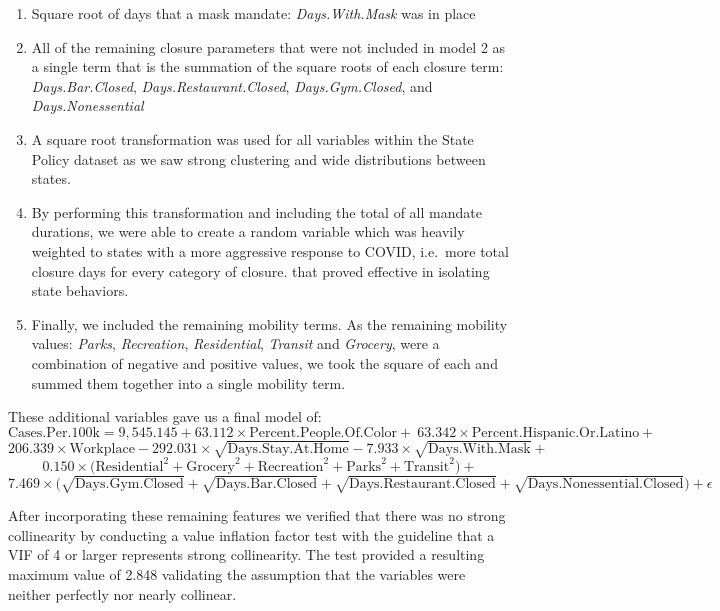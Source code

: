 \documentclass[
]{article}
\providecommand{\tightlist}{%
  \setlength{\itemsep}{0pt}\setlength{\parskip}{0pt}}
\begin{document}
\begin{enumerate}
\def\labelenumi{\arabic{enumi}.}
\tightlist
\item
  Square root of days that a mask mandate: \emph{Days.With.Mask} was in
  place
\item
  All of the remaining closure parameters that were not included in
  model 2 as a single term that is the summation of the square roots of
  each closure term: \emph{Days.Bar.Closed},
  \emph{Days.Restaurant.Closed}, \emph{Days.Gym.Closed}, and
  \emph{Days.Nonessential}
\item
  A square root transformation was used for all variables within the
  State Policy dataset as we saw strong clustering and wide
  distributions between states.
\item
  By performing this transformation and including the total of all
  mandate durations, we were able to create a random variable which was
  heavily weighted to states with a more aggressive response to COVID,
  i.e.~more total closure days for every category of closure. that
  proved effective in isolating state behaviors.
\item
  Finally, we included the remaining mobility terms. As the remaining
  mobility values: \emph{Parks}, \emph{Recreation}, \emph{Residential},
  \emph{Transit} and \emph{Grocery}, were a combination of negative and
  positive values, we took the square of each and summed them together
  into a single mobility term.
\end{enumerate}

These additional variables gave us a final model of:
\[ \text{Cases.Per.100k} = 9,545.145 + 63.112\times\text{Percent.People.Of.Color} + \ 63.342\times\text{Percent.Hispanic.Or.Latino} + \]
\[ 206.339 \times \text{Workplace} -292.031\times\sqrt{\text{Days.Stay.At.Home}} -7.933\times\sqrt{\text{Days.With.Mask}} + \]
\[0.150\times\Bigg({\text{Residential}^2 + \text{Grocery}^2 +  \text{Recreation}^2 + \text{Parks}^2 + \text{Transit}^2}\Bigg) +\]
\[ 7.469\times\Bigg({\sqrt{\text{Days.Gym.Closed}} + \sqrt{\text{Days.Bar.Closed}} + \sqrt{\text{Days.Restaurant.Closed}} + \sqrt{\text{Days.Nonessential.Closed}}}\Bigg) +\epsilon\]

After incorporating these remaining features we verified that there was
no strong collinearity by conducting a value inflation factor test with
the guideline that a VIF of 4 or larger represents strong collinearity.
The test provided a resulting maximum value of 2.848 validating the
assumption that the variables were neither perfectly nor nearly
collinear.
\end{document}
